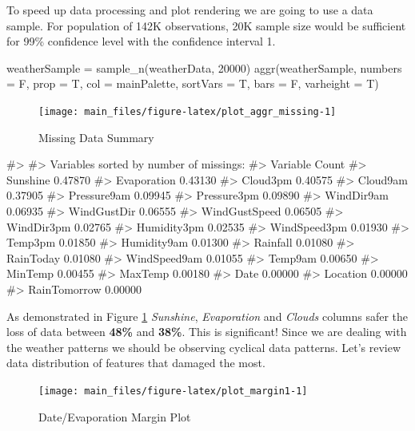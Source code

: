 To speed up data processing and plot rendering we are going to use a
data sample. For population of 142K observations, 20K sample size would
be sufficient for 99\% confidence level with the confidence interval 1.

\begin{Schunk}
\begin{Sinput}
weatherSample = sample_n(weatherData, 20000)
aggr(weatherSample, numbers = F, prop = T, col = mainPalette, sortVars = T, bars = F, varheight = T)
\end{Sinput}
\begin{figure}[H]

{\centering \texttt{[image: main\_files/figure-latex/plot\_aggr\_missing-1]} 

}

\caption[Missing Data Summary]{Missing Data Summary}\label{fig:plot_aggr_missing}
\end{figure}
\begin{Soutput}
#> 
#>  Variables sorted by number of missings: 
#>       Variable   Count
#>       Sunshine 0.47870
#>    Evaporation 0.43130
#>       Cloud3pm 0.40575
#>       Cloud9am 0.37905
#>    Pressure9am 0.09945
#>    Pressure3pm 0.09890
#>     WindDir9am 0.06935
#>    WindGustDir 0.06555
#>  WindGustSpeed 0.06505
#>     WindDir3pm 0.02765
#>    Humidity3pm 0.02535
#>   WindSpeed3pm 0.01930
#>        Temp3pm 0.01850
#>    Humidity9am 0.01300
#>       Rainfall 0.01080
#>      RainToday 0.01080
#>   WindSpeed9am 0.01055
#>        Temp9am 0.00650
#>        MinTemp 0.00455
#>        MaxTemp 0.00180
#>           Date 0.00000
#>       Location 0.00000
#>   RainTomorrow 0.00000
\end{Soutput}
\end{Schunk}

As demonstrated in Figure \ref{fig:plot_aggr_missing} \emph{Sunshine},
\emph{Evaporation} and \emph{Clouds} columns safer the loss of data
between \textbf{48\%} and \textbf{38\%}. This is significant! Since we
are dealing with the weather patterns we should be observing cyclical
data patterns. Let's review data distribution of features that damaged
the most.

\begin{Schunk}
\begin{figure}[H]

{\centering \texttt{[image: main\_files/figure-latex/plot\_margin1-1]} 

}

\caption[Date/Evaporation Margin Plot]{Date/Evaporation Margin Plot}\label{fig:plot_margin1}
\end{figure}
\end{Schunk}

